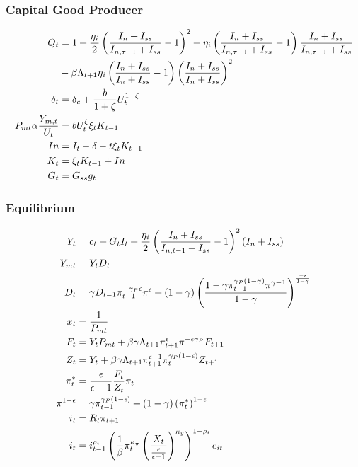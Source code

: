 \documentclass[document.tex]{subfiles}
\begin{document}
\subsubsection*{Capital Good Producer}
\begin{align*}
Q_t &= 1 + \frac{\eta_i}{2}  \left( \frac{I_n + I_{ss}}{I_{n,\tau -1}+I_{ss}}-1 \right)^2 
+ \eta_i   \left( \frac{I_n + I_{ss}}{I_{n,\tau -1}+I_{ss}}-1 \right)  \frac{I_n + I_{ss}}{I_{n,\tau -1}+I_{ss}} \\
&- \beta \Lambda_{t+1} \eta_i  \left( \frac{I_n + I_{ss}}{I_n+I_{ss}}-1 \right)
\left( \frac{I_n + I_{ss}}{I_n+I_{ss}} \right) ^2 \\
\delta_t &= \delta_c + \frac{b}{1+\zeta} U_t^{1+\zeta} \\
P_{mt} \alpha \frac{Y_{m,t}}{U_t} &= b U_t^{\zeta} \xi_t K_{t-1} \\
In &= I_t - \delta-t \xi_t K_{t-1} \\
K_t &= \xi_t K_{t-1} + In\\
G_t &= G_{ss} g_t \\
\end{align*}

\subsubsection*{Equilibrium}
\begin{align*}
Y_t &= c_t + G_t I_t + \frac{\eta_i}{2} \left( \frac{I_n + I_{ss}}{I_{n,t-1}+I_{ss}}-1\right)^2 \left( I_n+ I_{ss}\right) \\
Y_{mt} &= Y_t D_t \\
D_t &= \gamma D_{t-1} \pi_{t-1}^{-\gamma_P \epsilon} \pi^{\epsilon} 
+ \left( 1- \gamma \right) 
\left( \frac{
1-\gamma \pi_{t-1}^{\gamma_P \left( 1-\gamma \right)}
\pi^{\gamma-1}}
{1-\gamma} \right)^{\frac{-\epsilon}{1-\gamma}}   \\
x_t &= \frac{1}{P_{mt}} \\
F_t &= Y_t P_{mt}+ \beta \gamma \Lambda_{t+1} \pi_{t+1}^{\epsilon} \pi^{-\epsilon \gamma_P} F_{t+1} \\
Z_t &= Y_t + \beta  \gamma  \Lambda_{t+1} \pi_{t+1}^{\epsilon-1} 
\pi_t^{\gamma_P \left( 1-\epsilon\right)} Z_{t+1} \\
\pi_t^* &= \frac{\epsilon}{\epsilon-1} \frac{F_t}{Z_t}  \pi_t\\
\pi^{1-\epsilon} &= \gamma \pi_{t-1}^{\gamma_P \left( 1-\epsilon \right)} + \left( 1- \gamma \right) \left( \pi_t^*\right) ^{1- \epsilon} \\
i_t &= R_t \pi_{t+1} \\
i_t &= i_{t-1}^{\rho_i}
\left( 
\frac{1}{\beta} \pi_t^{\kappa_{\pi}}
\left(
\frac{X_t}{\frac{\epsilon}{\epsilon-1}} 
\right)^{\kappa_y}
\right) ^{1-\rho_i} e_{it}
\end{align*}
\end{document}
